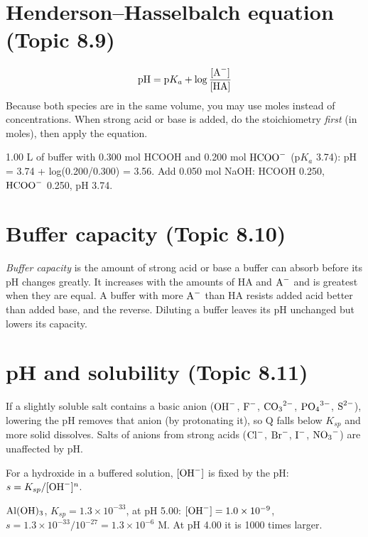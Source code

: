 \documentclass[11pt]{article}
\begin{document}
\section{Henderson--Hasselbalch equation (Topic 8.9)}\label{t:8.9}
\[ \text{pH} = \text{p}K_a + \log\frac{[\ce{A-}]}{[\ce{HA}]} \]
Because both species are in the same volume, you may use moles instead of concentrations. When strong acid or base is added, do the stoichiometry \emph{first} (in moles), then apply the equation.

 1.00 L of buffer with 0.300 mol HCOOH and 0.200 mol $\ce{HCOO-}$ (p$K_a$ 3.74): pH = 3.74 + log(0.200/0.300) = 3.56. Add 0.050 mol NaOH: HCOOH 0.250, $\ce{HCOO-}$ 0.250, pH 3.74.

\section{Buffer capacity (Topic 8.10)}\label{t:8.10}
\emph{Buffer capacity} is the amount of strong acid or base a buffer can absorb before its pH changes greatly. It increases with the amounts of HA and $\ce{A-}$ and is greatest when they are equal. A buffer with more $\ce{A-}$ than HA resists added acid better than added base, and the reverse. Diluting a buffer leaves its pH unchanged but lowers its capacity.

\section{pH and solubility (Topic 8.11)}\label{t:8.11}
If a slightly soluble salt contains a basic anion ($\ce{OH-}$, $\ce{F-}$, $\ce{CO3^2-}$, $\ce{PO4^3-}$, $\ce{S^2-}$), lowering the pH removes that anion (by protonating it), so Q falls below $K_{sp}$ and more solid dissolves. Salts of anions from strong acids ($\ce{Cl-}$, $\ce{Br-}$, $\ce{I-}$, $\ce{NO3-}$) are unaffected by pH.

For a hydroxide in a buffered solution, $[\ce{OH-}]$ is fixed by the pH: $s = K_{sp}/[\ce{OH-}]^n$.

 $\ce{Al(OH)3}$, $K_{sp} = 1.3\times10^{-33}$, at pH 5.00: $[\ce{OH-}] = 1.0\times10^{-9}$, $s = 1.3\times10^{-33}/10^{-27} = 1.3\times10^{-6}$ M. At pH 4.00 it is 1000 times larger.
\end{document}
